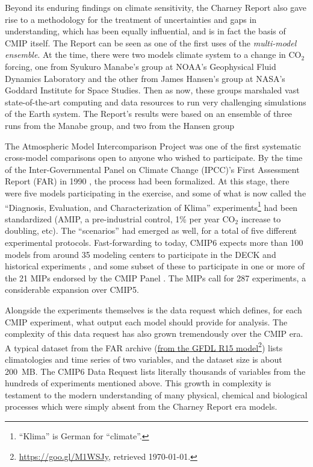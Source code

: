 \documentclass[gmd,manuscript]{copernicus}
\newcommand{\urlref}[2] {\href{#1}{#2}\footnote{\url{#1}, retrieved \today.}}
\begin{document}
Beyond its
enduring findings on climate sensitivity, the Charney Report also gave
rise to a methodology for the treatment of uncertainties and gaps in
understanding, which has been equally influential, and is in fact the
basis of CMIP itself. The Report can be seen as one of the first uses
of the \emph{multi-model ensemble}. At the time, there were two models
climate system to a change in CO$_2$ forcing, one from Syukuro
Manabe's group at NOAA's Geophysical Fluid Dynamics Laboratory and
the other from James Hansen's group at NASA's Goddard Institute for
Space Studies. Then as now, these groups marshaled vast
state-of-the-art computing and data resources to run very challenging
simulations of the Earth system. The Report's results were based on an
ensemble of
three runs from the Manabe group,
and two from the Hansen group

The Atmospheric Model Intercomparison Project
\citep[AMIP:][]{ref:gates1992} was one of the first systematic
cross-model comparisons open to anyone who wished to participate.
By the time of the Inter-Governmental Panel on Climate Change (IPCC)'s
First Assessment Report (FAR) in 1990 \citep{ref:houghtonetal1992},
the process had been formalized. At this stage, there were
five models participating in the exercise, and some of what
is now called the ``Diagnosis, Evaluation, and Characterization of
Klima'' \citep[DECK, see][]{ref:eyringetal2016a}
experiments\footnote{``Klima'' is German for ``climate''.} had been
standardized (AMIP, a pre-industrial control, 1\% per year CO$_2$
increase to doubling, etc). The ``scenarios'' had emerged as well, for
a total of
five different experimental protocols. Fast-forwarding to today, CMIP6
expects more than 100 models from around 35 modeling centers \citep[in
14 countries, a stark contrast to the US monopoly
in][]{ref:charneyetal1979} to participate in the DECK and historical
experiments \citep[Table~2 of][]{ref:eyringetal2016a}, and some subset
of these to participate in one or more of the 21 MIPs endorsed by the
CMIP Panel \citep[Table~3 of][, now 23 with two new endorsed MIPs
since]{ref:eyringetal2016a}.
The MIPs call for 287 experiments, a considerable expansion over
CMIP5.

Alongside the experiments themselves is the data request which
defines, for each CMIP experiment, what output each model should
provide for analysis. The complexity of this data request has also
grown tremendously over the CMIP era. A typical dataset from the FAR
archive (\urlref{https://goo.gl/M1WSJy}{from the GFDL R15 model}) lists
climatologies and time series of two variables, and the dataset size
is about 200~MB. The CMIP6 Data Request \cite{ref:juckesetal2015}
lists literally thousands of variables from the hundreds of
experiments mentioned above. This growth in complexity is testament to
the modern understanding of many physical, chemical and biological
processes which were simply absent from the Charney Report era models.
\end{document}
